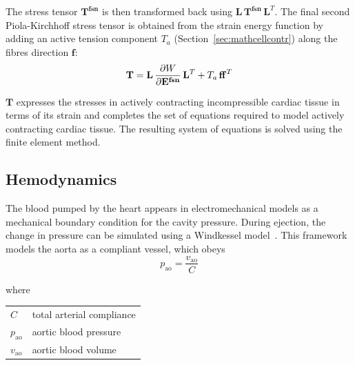 



\noindent
The stress tensor $\mathbf{T^{fsn}}$ is then transformed back using $\mathbf{L}\,\mathbf{T^{fsn}}\,\mathbf{L}^T$. The final second Piola-Kirchhoff stress tensor is obtained from the strain energy function by adding an active tension component $T_a$ (Section~\ref{sec:mathcellcontr}) along the fibres direction $\mathbf{f}$:
%
\begin{equation}\label{eq:eqce}
    \mathbf{T} = \mathbf{L}\,\dfrac{\partial {W}}{\partial {\mathbf{E^{fsn}}}}\,\mathbf{L}^T + T_a\,\mathbf{ff}^T
\end{equation}

\noindent
$\mathbf{T}$ expresses the stresses in actively contracting incompressible cardiac tissue in terms of its strain and completes the set of equations required to model actively contracting cardiac tissue. The resulting system of equations is solved using the finite element method.


%
%
%
\subsection{Hemodynamics}\label{sec:hemodynamics_math_modelling}
The blood pumped by the heart appears in electromechanical models as a mechanical boundary condition for the cavity pressure. During ejection, the change in pressure can be simulated using a Windkessel model~\cite{Westerhof:1971}. This framework models the aorta as a compliant vessel, which obeys
%
\begin{equation}\label{eq:firstwkelem}
    p_{\textrm{ao}} = \frac{v_{\textrm{ao}}}{C}
\end{equation}

\noindent
where

\vspace{0.2cm}
\begin{tabular}{ll}
    $C$ & total arterial compliance \\
    $p_{\textrm{ao}}$ & aortic blood pressure \\
    $v_{\textrm{ao}}$ & aortic blood volume \\
\end{tabular}


